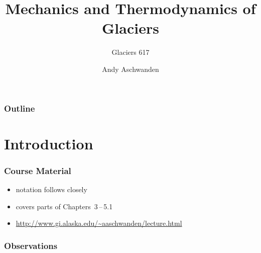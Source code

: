 \documentclass[hide notes,intlimits]{beamer}
\title[Glacier Dynamics] %
{Mechanics and Thermodynamics of Glaciers}
\subtitle{Glaciers 617}
\author[Aschwanden] %
{Andy Aschwanden}
\institute[ARSC] %
{
  Arctic Region Supercomputing Center\\
  University of Alaska Fairbanks, USA
}
\begin{document}
\begin{frame}
  \titlepage
\end{frame}

\begin{frame}
 \frametitle{Outline}
 \tableofcontents[subsectionstyle=hide]
\end{frame}

\section{Introduction}



\begin{frame}[plain] %
  \begin{figure}
  \end{figure}
\end{frame}

\begin{frame}
  \frametitle{Course Material}
  \begin{itemize}
    \item notation follows closely \cite{GreveBlatter_disg}
    \item covers parts of Chapters~3\,--\,5.1
    \item \url{http://www.gi.alaska.edu/~aaschwanden/lecture.html}
  \end{itemize}
  \def\newblock{}
  
\end{frame}


\begin{frame}
  \frametitle{Observations}
\end{frame}
\end{document}
